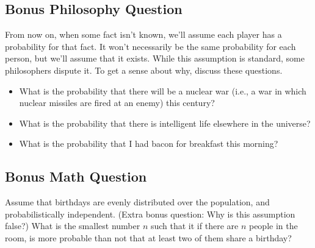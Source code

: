 \documentclass[11pt,]{article}
\providecommand{\tightlist}{%
  \setlength{\itemsep}{0pt}\setlength{\parskip}{0pt}}
\begin{document}
\hypertarget{bonus-philosophy-question}{%
\subsection{Bonus Philosophy Question}\label{bonus-philosophy-question}}

From now on, when some fact isn't known, we'll assume each player has a
probability for that fact. It won't necessarily be the same probability
for each person, but we'll assume that it exists. While this assumption
is standard, some philosophers dispute it. To get a sense about why,
discuss these questions.

\begin{itemize}
\tightlist
\item
  What is the probability that there will be a nuclear war (i.e., a war
  in which nuclear missiles are fired at an enemy) this century?
\item
  What is the probability that there is intelligent life elsewhere in
  the universe?
\item
  What is the probability that I had bacon for breakfast this morning?
\end{itemize}

\hypertarget{bonus-math-question}{%
\subsection{Bonus Math Question}\label{bonus-math-question}}

Assume that birthdays are evenly distributed over the population, and
probabilistically independent. (Extra bonus question: Why is this
assumption false?) What is the smallest number \(n\) such that it if
there are \(n\) people in the room, is more probable than not that at
least two of them share a birthday?
\end{document}
